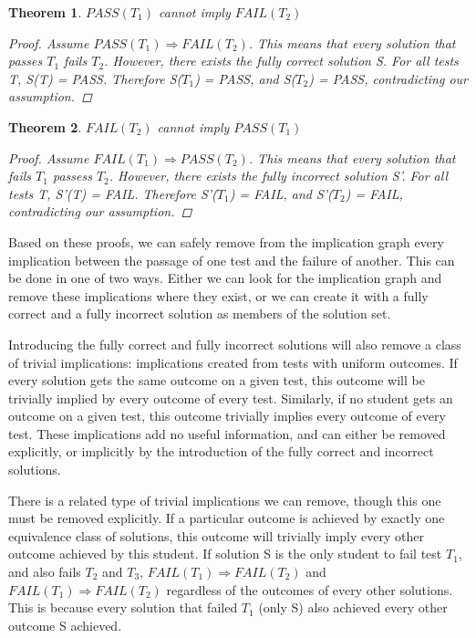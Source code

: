 \documentclass[11pt,twoside]{article}
\newcommand\fail{\mathit{FAIL}}
\newcommand\pass{\mathit{PASS}}
\newtheorem{thm}{Theorem}
\theoremstyle{definition}
\begin{document}
\begin{thm} $\pass(T_1)$ cannot imply $\fail(T_2)$

\begin{proof} Assume $\pass(T_1) \Rightarrow \fail(T_2)$. This means that every solution that passes $T_1$ fails $T_2$. However, there exists the fully correct solution S. For all tests T, S(T) = PASS. Therefore S($T_1$) = PASS, and S($T_2$) = PASS, contradicting our assumption.
\end{proof}
\end{thm}

\begin{thm} $\fail(T_2)$ cannot imply $\pass(T_1)$

\begin{proof} Assume $\fail(T_1) \Rightarrow \pass(T_2)$. This means that every solution that fails $T_1$ passess $T_2$. However, there exists the fully incorrect solution S'. For all tests T, S'(T) = FAIL. Therefore S'($T_1$) = FAIL, and S'($T_2$) = FAIL, contradicting our assumption.
\end{proof}
\end{thm}



Based on these proofs, we can safely remove from the implication graph every implication between the passage of one test and the failure of another. This can be done in one of two ways. Either we can look for the implication graph and remove these implications where they exist, or we can create it with a fully correct and a fully incorrect solution as members of the solution set.

Introducing the fully correct and fully incorrect solutions will also remove a class of trivial implications: implications created from tests with uniform outcomes. If every solution gets the same outcome on a given test, this outcome will be trivially implied by every outcome of every test. Similarly, if no student gets an outcome on a given test, this outcome trivially implies every outcome of every test. These implications add no useful information, and can either be removed explicitly, or implicitly by the introduction of the fully correct and incorrect solutions.

There is a related type of trivial implications we can remove, though this one must be removed explicitly. If a particular outcome is achieved by exactly one equivalence class of solutions, this outcome will trivially imply every other outcome achieved by this student. If solution S is the only student to fail test $T_1$, and also fails $T_2$ and $T_3$, $\fail(T_1) \Rightarrow \fail(T_2)$ and $\fail(T_1) \Rightarrow \fail(T_2)$ regardless of the outcomes of every other solutions. This is because every solution that failed $T_1$ (only S) also achieved every other outcome S achieved. 
\end{document}
